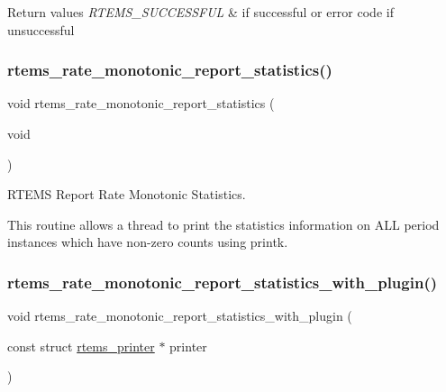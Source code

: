 \begin{DoxyRetVals}{Return values}
{\em R\+T\+E\+M\+S\+\_\+\+S\+U\+C\+C\+E\+S\+S\+F\+UL} & if successful or error code if unsuccessful \\
\hline
\end{DoxyRetVals}
\mbox{\label{group__ClassicRateMon_ga556dec002aada3b85d6af370fe233848}} 
\subsubsection{\texorpdfstring{rtems\_rate\_monotonic\_report\_statistics()}{rtems\_rate\_monotonic\_report\_statistics()}}
{\footnotesize\ttfamily void rtems\+\_\+rate\+\_\+monotonic\+\_\+report\+\_\+statistics (\begin{DoxyParamCaption}\item[{void}]{ }\end{DoxyParamCaption})}



R\+T\+E\+MS Report Rate Monotonic Statistics. 

This routine allows a thread to print the statistics information on A\+LL period instances which have non-\/zero counts using printk. \mbox{\label{group__ClassicRateMon_ga062540df1e5b9d2c99ac1f372491d5e8}} 
\subsubsection{\texorpdfstring{rtems\_rate\_monotonic\_report\_statistics\_with\_plugin()}{rtems\_rate\_monotonic\_report\_statistics\_with\_plugin()}}
{\footnotesize\ttfamily void rtems\+\_\+rate\+\_\+monotonic\+\_\+report\+\_\+statistics\+\_\+with\+\_\+plugin (\begin{DoxyParamCaption}\item[{const struct \mbox{\hyperlink{structrtems__printer}{rtems\+\_\+printer}} $\ast$}]{printer }\end{DoxyParamCaption})}



